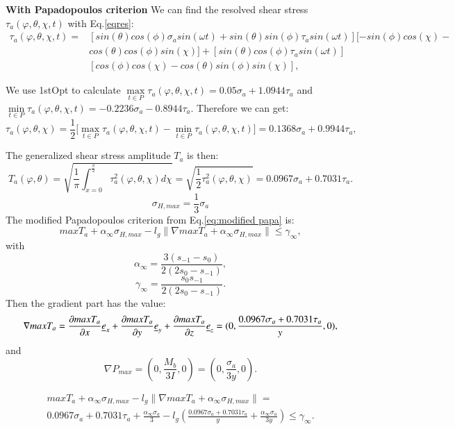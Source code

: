 \documentclass[3p,times,procedia,number]{elsarticle}
\begin{document}
\textbf{With Papadopoulos criterion}
We can find the resolved shear stress $\tau_a(\varphi,\theta,\chi ,t)$ with Eq.\eqref{eqres}:
\begin{equation}
\begin{split}
\tau_a(\varphi,\theta,\chi ,t)=&[sin(\theta) cos(\phi)\sigma_a sin(\omega t) + sin(\theta) sin(\phi) \tau_a sin(\omega t)] [-sin(\phi)cos(\chi)-\\&cos(\theta)cos(\phi)sin(\chi)]+[sin(\theta)cos(\phi) \tau_a sin(\omega t)]\\&[cos(\phi) cos(\chi)-cos(\theta) sin(\phi) sin(\chi)] ,
\end{split}
\end{equation}

We use 1stOpt to calculate $\max \limits_{t\in P}\tau_a(\varphi,\theta,\chi ,t)=0.05\sigma_a + 1.0944\tau_a$ and $\min \limits_{t\in P}\tau_a(\varphi,\theta,\chi ,t)=- 0.2236\sigma_a - 0.8944\tau_a$. Therefore we can get: $$\tau_a(\varphi,\theta,\chi)=\frac{1}{2}\big[\max \limits_{t\in P}\tau_a(\varphi,\theta,\chi ,t)-\min \limits_{t\in P}\tau_a(\varphi,\theta,\chi ,t)\big]=0.1368\sigma_a+0.9944\tau_a,$$

The generalized shear stress amplitude $T_a$ is then:
$$
T_a(\varphi,\theta)=\sqrt{\frac{1}{\pi}\int_{x=0}^{\frac{\pi}{2}} \tau_a^2(\varphi,\theta,\chi)d\chi}=\sqrt{\frac{1}{2}\tau_a^2(\varphi,\theta,\chi)}=0.0967\sigma_a+0.7031\tau_a.
$$
$$\sigma_{H,max}=\frac{1}{3}\sigma_a$$
The modified Papadopoulos criterion from Eq.\eqref{eq:modified papa} is:
$$maxT_a+\alpha_\infty\sigma_{H,max}-l_g\parallel\nabla{maxT_a}+\alpha_\infty\sigma_{H,max}\parallel\leqslant \gamma_\infty,$$
with
$$\alpha_\infty=\frac{3(s_{-1}-s_0)}{2(2s_0-s_{-1})},$$
$$\gamma_\infty=\frac{s_0s_{-1}}{2(2s_0-s_{-1})}.$$
Then the gradient part has the value:
\begin{equation}
\begin{split}
\nabla{maxT_a}=\frac{\partial{maxT_a}}{\partial x}\uline{e}_x+\frac{\partial{maxT_a}}{\partial y}\uline{e}_y+\frac{\partial{maxT_a}}{\partial z}\uline{e}_z=(0,\frac{0.0967\sigma_a+0.7031\tau_a}{y},0),
\end{split}
\end{equation}
and
\begin{equation}
\nabla P_{max}=(0,\frac{M_b}{3I},0)=(0,\frac{\sigma_a}{3y},0).
\end{equation}

\begin{equation}
\begin{split}
maxT_a+\alpha_\infty\sigma_{H,max}-l_g\parallel\nabla{maxT_a}+\alpha_\infty\sigma_{H,max}\parallel=\\0.0967\sigma_a+0.7031\tau_a+\frac{\alpha_\infty\sigma_a}{3}-l_g(\frac{0.0967\sigma_a+0.7031\tau_a}{y}+\frac{\alpha_\infty\sigma_a}{3y})\leqslant \gamma_\infty.
\end{split}
\end{equation}
\end{document}
